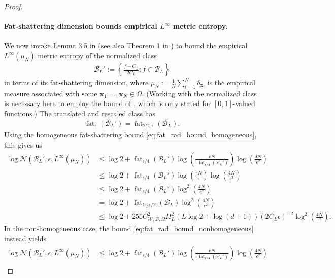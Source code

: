 \documentclass{article}
\DeclareMathOperator{\fat}{\mathrm{fat}}
\def\vx{{\bm{x}}}
\def\cB{{\mathcal{B}}}
\def\cN{{\mathcal{N}}}
\def\cW{{\mathcal{W}}}
\begin{document}
\begin{appendices}
\begin{proof}
    \paragraph{Fat-shattering dimension bounds empirical $L^\infty$ metric entropy.} We now invoke Lemma 3.5 in \cite{alon1997scale} (see also Theorem 1 in \cite{mendelson2001geometric}) to bound the empirical $L^\infty(\mu_N)$ metric entropy of the normalized class
    \begin{align} \label{eq:B_L_normalized}
        \cB_L' := \left\{ \frac{f + C_L}{2 C_L}: f \in \cB_L \right\}
    \end{align}
    in terms of its fat-shattering dimension, where $\mu_N := \frac{1}{N} \sum_{i=1}^N \delta_{\vx_i}$ is the empirical measure associated with some $\vx_1, \dots, \vx_N \in \Omega$. (Working with the normalized class is necessary here to employ the bound of \cite{alon1997scale}, which is only stated for $[0,1]$-valued functions.) The translated and rescaled class has
    \begin{align}
        \fat_\epsilon(\cB_L') = \fat_{2 C_L \epsilon}(\cB_L).
    \end{align}
    Using the homogeneous fat-shattering bound \eqref{eq:fat_rad_bound_homogeneous}, this gives us
    \begin{align} \label{eq:L_inf_empirical_bound_homogeneous}
        \log \cN(\cB_L', \epsilon, L^\infty(\mu_N)) &\leq \log 2 + \fat_{\epsilon/4} (\cB_L') \log \left( \frac{eN}{\epsilon \fat_{\epsilon/4} (\cB_L')} \right) \log \left( \frac{4N}{\epsilon^{2}} \right) \\
        &\leq \log 2 + \fat_{\epsilon/4} (\cB_L') \log \left( \frac{eN}{\epsilon} \right) \log \left( \frac{4N}{\epsilon^{2}} \right) \\
        &\leq \log 2 + \fat_{\epsilon/4} (\cB_L') \log^2 \left( \frac{4N}{\epsilon^2} \right) \\
        &= \log 2 + \fat_{C_L \epsilon/2} (\cB_L) \log^2 \left( \frac{4N}{\epsilon^2} \right) \\
        &\leq \log 2 +  256 C_{\cW, \cB, \Omega}^2 \Pi_L^2 \left(L \log 2 + \log(d+1) \right) (2 C_L \epsilon)^{-2} \log^2 \left( \frac{4N}{\epsilon^2} \right).
    \end{align}
    In the non-homogeneous case, the bound \eqref{eq:fat_rad_bound_nonhomogeneous} instead yields
    \begin{align} \label{eq:L_inf_empirical_bound_nonhomogeneous}
        \log \cN(\cB_L', \epsilon, L^\infty(\mu_N)) &\leq \log 2 + \fat_{\epsilon/4} (\cB_L') \log \left( \frac{eN}{\epsilon \fat_{\epsilon/4} (\cB_L')} \right) \log \left( \frac{4N}{\epsilon^{2}} \right) \\

\end{align}
\end{proof}
\end{appendices}
\end{document}

